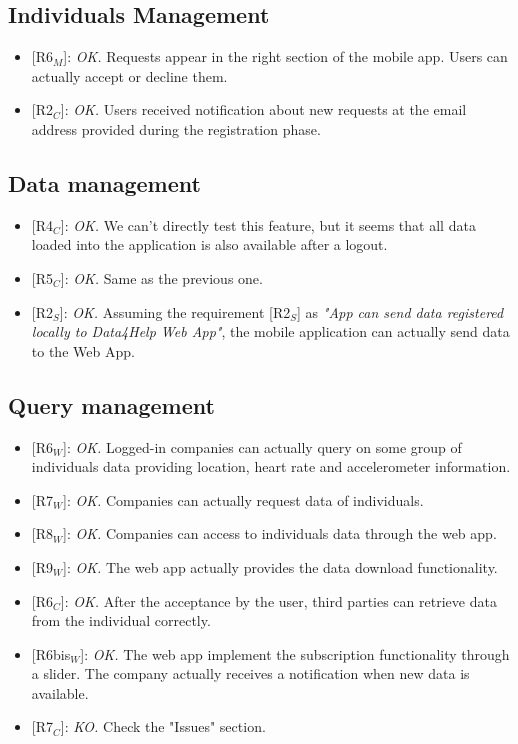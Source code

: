 \documentclass{article}
\begin{document}
\subsection{Individuals Management}
\begin{itemize}
	\item {[R6$_M$]}: \textit{OK.} Requests appear in the right section of the mobile app. Users can actually accept or decline them.
	\item {[R2$_C$]}: \textit{OK.} Users received notification about new requests at the email address provided during the registration phase.
\end{itemize}

\subsection{Data management}
\begin{itemize}
	\item {[R4$_C$]}: \textit{OK.} We can't directly test this feature, but it seems that all data loaded into the application is also available after a logout.
	\item {[R5$_C$]}: \textit{OK.} Same as the previous one.
	\item {[R2$_S$]}: \textit{OK.} Assuming the requirement {[R2$_S$]} as \textit{"App can send data registered locally to Data4Help Web App"}, the mobile application can actually send data to the Web App.
\end{itemize}

\subsection{Query management}

\begin{itemize}
	\item {[R6$_W$]}: \textit{OK.} Logged-in companies can actually query on some group of individuals data providing location, heart rate and accelerometer information.
	\item {[R7$_W$]}: \textit{OK.} Companies can actually request data of individuals. 
	\item {[R8$_W$]}: \textit{OK.} Companies can access to individuals data through the web app.
	\item {[R9$_W$]}: \textit{OK.} The web app actually provides the data download functionality.
	\item {[R6$_C$]}: \textit{OK.} After the acceptance by the user, third parties can retrieve data from the individual correctly. 
	\item {[R6bis$_W$]}: \textit{OK.} The web app implement the subscription functionality through a slider. The company actually receives a notification when new data is available.
	\item {[R7$_C$]}: \textit{KO.} Check the "Issues" section.
\end{itemize}
\end{document}
